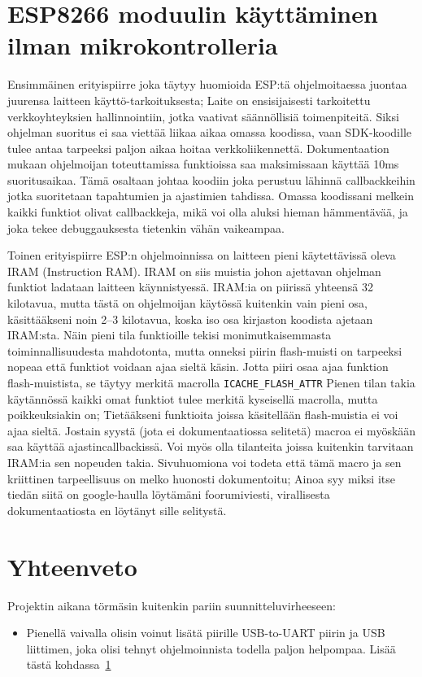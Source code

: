 \section{ESP8266 moduulin käyttäminen ilman mikrokontrolleria}
\label{sec:extra}

Ensimmäinen erityispiirre joka täytyy huomioida ESP:tä ohjelmoitaessa juontaa
juurensa laitteen käyttö-tarkoituksesta; Laite on ensisijaisesti tarkoitettu
verkkoyhteyksien hallinnointiin, jotka vaativat säännöllisiä toimenpiteitä.
Siksi ohjelman suoritus ei saa viettää liikaa aikaa omassa koodissa, vaan
SDK-koodille tulee antaa tarpeeksi paljon aikaa hoitaa verkkoliikennettä.
Dokumentaation mukaan ohjelmoijan toteuttamissa funktioissa saa maksimissaan
käyttää 10ms suoritusaikaa. Tämä osaltaan johtaa koodiin joka perustuu lähinnä
callbackkeihin jotka suoritetaan tapahtumien ja ajastimien tahdissa. Omassa
koodissani melkein kaikki funktiot olivat callbackkeja, mikä voi olla aluksi
hieman hämmentävää, ja joka tekee debuggauksesta tietenkin vähän vaikeampaa.

Toinen erityispiirre ESP:n ohjelmoinnissa on laitteen pieni käytettävissä oleva
IRAM (Instruction RAM). IRAM on siis muistia johon ajettavan ohjelman funktiot
ladataan laitteen käynnistyessä. IRAM:ia on piirissä yhteensä 32 kilotavua,
mutta tästä on ohjelmoijan käytössä kuitenkin vain pieni osa, käsittääkseni
noin 2--3 kilotavua, koska iso osa kirjaston koodista ajetaan IRAM:sta. Näin
pieni tila funktioille tekisi monimutkaisemmasta toiminnallisuudesta
mahdotonta, mutta onneksi piirin flash-muisti on tarpeeksi nopeaa että funktiot
voidaan ajaa sieltä käsin. Jotta piiri osaa ajaa funktion flash-muistista, se
täytyy merkitä macrolla \texttt{ICACHE\_FLASH\_ATTR} Pienen tilan takia
käytännössä kaikki omat funktiot tulee merkitä kyseisellä macrolla, mutta
poikkeuksiakin on; Tietääkseni funktioita joissa käsitellään flash-muistia ei
voi ajaa sieltä.  Jostain syystä (jota ei dokumentaatiossa selitetä) macroa ei
myöskään saa käyttää ajastincallbackissä.  Voi myös olla tilanteita joissa
kuitenkin tarvitaan IRAM:ia sen nopeuden takia.  Sivuhuomiona voi todeta että
tämä macro ja sen kriittinen tarpeellisuus on melko huonosti dokumentoitu;
Ainoa syy miksi itse tiedän siitä on google-haulla löytämäni foorumiviesti,
virallisesta dokumentaatiosta en löytänyt sille selitystä.

\section{Yhteenveto}

Projektin aikana törmäsin kuitenkin pariin suunnitteluvirheeseen:
\begin{itemize}
  \item Pienellä vaivalla olisin voinut lisätä piirille USB-to-UART piirin ja
    USB liittimen, joka olisi tehnyt ohjelmoinnista todella paljon helpompaa.
    Lisää tästä kohdassa~\ref{sec:extra}
\end{itemize}
